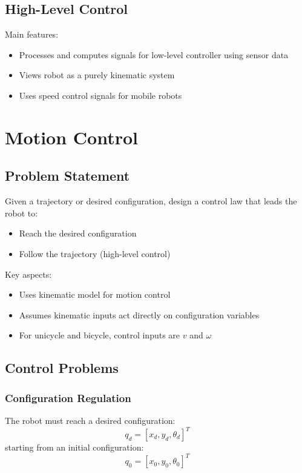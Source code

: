 \documentclass[openany]{book}
\theoremstyle{definition}
\theoremstyle{remark}
\begin{document}
\subsection{High-Level Control}
Main features:
\begin{itemize}
    \item Processes and computes signals for low-level controller using sensor data
    \item Views robot as a purely kinematic system
    \item Uses speed control signals for mobile robots
\end{itemize}

\section{Motion Control}

\subsection{Problem Statement}
Given a trajectory or desired configuration, design a control law that leads the robot to:
\begin{itemize}
    \item Reach the desired configuration
    \item Follow the trajectory (high-level control)
\end{itemize}

Key aspects:
\begin{itemize}
    \item Uses kinematic model for motion control
    \item Assumes kinematic inputs act directly on configuration variables
    \item For unicycle and bicycle, control inputs are $v$ and $\omega$
\end{itemize}

\subsection{Control Problems}

\subsubsection{Configuration Regulation}
The robot must reach a desired configuration:
\begin{equation}
    q_d = [x_d, y_d, \theta_d]^T
\end{equation}
starting from an initial configuration:
\begin{equation}
    q_0 = [x_0, y_0, \theta_0]^T
\end{equation}
\end{document}
